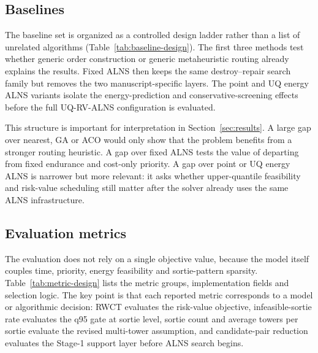 \subsection{Baselines}

The baseline set is organized as a controlled design ladder rather than a list of unrelated algorithms (Table~\ref{tab:baseline-design}). The first three methods test whether generic order construction or generic metaheuristic routing already explains the results. Fixed ALNS then keeps the same destroy--repair search family but removes the two manuscript-specific layers. The point and UQ energy ALNS variants isolate the energy-prediction and conservative-screening effects before the full UQ-RV-ALNS configuration is evaluated.



This structure is important for interpretation in Section~\ref{sec:results}. A large gap over nearest, GA or ACO would only show that the problem benefits from a stronger routing heuristic. A gap over fixed ALNS tests the value of departing from fixed endurance and cost-only priority. A gap over point or UQ energy ALNS is narrower but more relevant: it asks whether upper-quantile feasibility and risk-value scheduling still matter after the solver already uses the same ALNS infrastructure.

\subsection{Evaluation metrics}

The evaluation does not rely on a single objective value, because the model itself couples time, priority, energy feasibility and sortie-pattern sparsity. Table~\ref{tab:metric-design} lists the metric groups, implementation fields and selection logic. The key point is that each reported metric corresponds to a model or algorithmic decision: RWCT evaluates the risk-value objective, infeasible-sortie rate evaluates the q95 gate at sortie level, sortie count and average towers per sortie evaluate the revised multi-tower assumption, and candidate-pair reduction evaluates the Stage-1 support layer before ALNS search begins.



